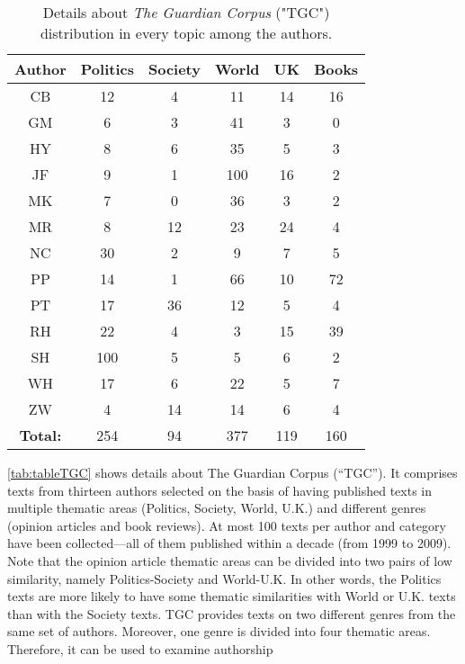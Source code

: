 \begin{table}[h!]
	\begin{center}  
		\caption[The Guardian Corpus topics distribution details]{Details about \textit{The Guardian Corpus} ("TGC") distribution in every topic among the authors.} 
		\label{tab:tableTGC}
		\begin{tabular}{|c | c | c | c | c | c |}
			\hline 
			Author & Politics & Society & World & UK & Books \\
			\hline \hline
			CB & 12 & 4 & 11 & 14 & 16 \\ \hline
			GM & 6 & 3 & 41 & 3 & 0 \\ \hline
			HY & 8 & 6 & 35 & 5 & 3 \\ \hline
			JF & 9 & 1 & 100 & 16 & 2 \\ \hline
			MK & 7 & 0 & 36 & 3 & 2 \\ \hline
			MR & 8 & 12 & 23 & 24 & 4 \\ \hline
			NC & 30 & 2 & 9 & 7 & 5 \\ \hline
			PP & 14 & 1 & 66 & 10 & 72 \\ \hline
			PT & 17 & 36 & 12 & 5 & 4 \\ \hline
			RH & 22 & 4 & 3 & 15 & 39 \\ \hline
			SH & 100 & 5 & 5 & 6 & 2 \\ \hline
			WH & 17 & 6 & 22 & 5 & 7 \\ \hline
			ZW & 4 & 14 & 14 & 6 & 4 \\ \hline
			\textbf{Total:} & 254 & 94 & 377 & 119 & 160 \\ \hline
		\end{tabular} 
	\end{center}
\end{table}
\autoref{tab:tableTGC} shows details about The Guardian Corpus (“TGC”). It comprises texts from thirteen authors selected on the basis of having published texts in multiple thematic areas (Politics,
Society, World, U.K.) and different genres (opinion articles and book reviews). At most 100 texts per author and category have been collected—all of them published within a decade (from
1999 to 2009). Note that the opinion article thematic areas can be divided into two pairs of low similarity, namely Politics-Society and World-U.K. In other words, the Politics texts are more likely to have some thematic similarities with World or U.K. texts than with the Society texts.
TGC provides texts on two different genres from the same set of authors. Moreover, one genre is divided into four thematic areas. Therefore, it can be used to examine authorship
